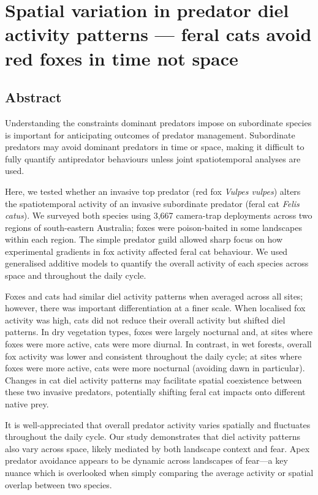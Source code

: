 \documentclass[11pt,a4paper,titlepage,twoside,openright]{style/unimelbthesis}
\begin{document}
\begin{mainmatter}
\hypertarget{diel}{%
\chapter{Spatial variation in predator diel activity patterns --- feral cats avoid red foxes in time not space}\label{diel}}

\hypertarget{abstract-3}{%
\section*{Abstract}\label{abstract-3}}

Understanding the constraints dominant predators impose on subordinate species is important for anticipating outcomes of predator management. Subordinate predators may avoid dominant predators in time or space, making it difficult to fully quantify antipredator behaviours unless joint spatiotemporal analyses are used.

Here, we tested whether an invasive top predator (red fox \emph{Vulpes vulpes}) alters the spatiotemporal activity of an invasive subordinate predator (feral cat \emph{Felis catus}). We surveyed both species using 3,667 camera-trap deployments across two regions of south-eastern Australia; foxes were poison-baited in some landscapes within each region. The simple predator guild allowed sharp focus on how experimental gradients in fox activity affected feral cat behaviour. We used generalised additive models to quantify the overall activity of each species across space and throughout the daily cycle.

Foxes and cats had similar diel activity patterns when averaged across all sites; however, there was important differentiation at a finer scale. When localised fox activity was high, cats did not reduce their overall activity but shifted diel patterns. In dry vegetation types, foxes were largely nocturnal and, at sites where foxes were more active, cats were more diurnal. In contrast, in wet forests, overall fox activity was lower and consistent throughout the daily cycle; at sites where foxes were more active, cats were more nocturnal (avoiding dawn in particular). Changes in cat diel activity patterns may facilitate spatial coexistence between these two invasive predators, potentially shifting feral cat impacts onto different native prey.

It is well-appreciated that overall predator activity varies spatially and fluctuates throughout the daily cycle. Our study demonstrates that diel activity patterns also vary across space, likely mediated by both landscape context and fear. Apex predator avoidance appears to be dynamic across landscapes of fear---a key nuance which is overlooked when simply comparing the average activity or spatial overlap between two species.


\end{mainmatter}
\end{document}
